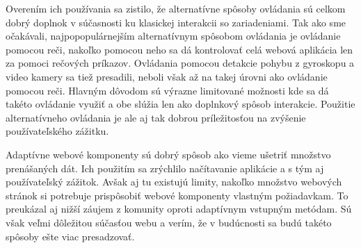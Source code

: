 Overením ich používania sa zistilo, že alternatívne spôsoby ovládania sú celkom dobrý doplnok v súčasnosti ku klasickej interakcii so zariadeniami. Tak ako sme očakávali, najpopopulárnejším alternatívnym spôsobom ovládania je ovládanie pomocou reči, nakoľko pomocou neho sa dá kontrolovať celá webová aplikácia len za pomoci rečových príkazov. Ovládania pomocou detakcie pohybu z gyroskopu a video kamery sa tiež presadili, neboli však až na takej úrovni ako ovládanie pomocou reči. Hlavným dôvodom sú výrazne limitované možnosti kde sa dá takéto ovládanie využiť a obe slúžia len ako doplnkový spôsob interakcie. Použitie alternatívneho ovládania je ale aj tak dobrou príležitosťou na zvýšenie používateľského zážitku.

Adaptívne webové komponenty sú dobrý spôsob ako vieme ušetriť množstvo prenášaných dát. Ich použitím sa zrýchlilo načítavanie aplikácie a s tým aj používateľský zážitok. Avšak aj tu existujú limity, nakoľko množstvo webových stránok si potrebuje prispôsobiť webové komponenty vlastným požiadavkam. To preukázal aj nižší záujem z komunity oproti adaptívnym vstupným metódam. Sú však veľmi dôležitou súčasťou webu a verím, že v budúcnosti sa budú takéto spôsoby ešte viac presadzovať.


